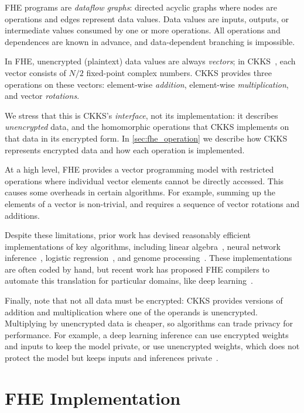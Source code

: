 FHE programs are \emph{dataflow graphs}: directed acyclic graphs where nodes
are operations and edges represent data values. Data values are inputs,
outputs, or intermediate values consumed by one or more operations. All
operations and dependences are known in advance, and data-dependent branching
is impossible.

In FHE, unencrypted (plaintext) data values are always \emph{vectors}; in
CKKS~\cite{brakerski:toct14:leveled}, each vector consists of $N/2$ fixed-point
complex numbers. CKKS provides three operations on these vectors: element-wise
\emph{addition}, element-wise \emph{multiplication}, and vector
\emph{rotations}.

We stress that this is CKKS's \emph{interface}, not its implementation: it
describes \emph{unencrypted} data, and the homomorphic operations that CKKS
implements on that data in its encrypted form.  In \autoref{sec:fhe_operation}
we describe how CKKS represents encrypted data and how each operation is
implemented.

At a high level, FHE provides a vector programming model with restricted
operations where individual vector elements cannot be directly accessed.  This
causes some overheads in certain algorithms. For example, summing up the
elements of a vector is non-trivial, and requires a sequence of vector
rotations and additions.

Despite these limitations, prior work has devised reasonably efficient
implementations of key algorithms, including linear
algebra~\cite{halevi:crypto14:algorithms}, neural network
inference~\cite{brutzkus:icml19:low, gilad:icml16:cryptonets}, logistic
regression~\cite{han:iacr18:efficient}, and genome
processing~\cite{blatt:nas20:secure}. These implementations are often coded by
hand, but recent work has proposed FHE compilers to automate this translation
for particular domains, like deep
learning~\cite{dathathri:pldi19:chet,dathathri:pldi20:eva}.

Finally, note that not all data must be encrypted: CKKS provides versions of
addition and multiplication where one of the operands is unencrypted.
Multiplying by unencrypted data is cheaper, so algorithms can trade privacy for
performance. For example, a deep learning inference can use encrypted weights
and inputs to keep the model private, or use unencrypted weights, which does
not protect the model but keeps inputs and inferences
private~\cite{brutzkus:icml19:low}.

\section{FHE Implementation}
\label{sec:fhe_operation}

